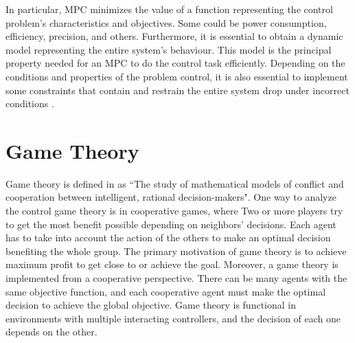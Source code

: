 In particular, MPC minimizes the value of a function representing the control problem's characteristics and objectives. Some could be power consumption, efficiency, precision, and others. Furthermore, it is essential to obtain a dynamic model representing the entire system's behaviour. This model is the principal property needed for an MPC to do the control task efficiently. Depending on the conditions and properties of the problem control, it is also essential to implement some constraints that contain and restrain the entire system drop under incorrect conditions \cite{MAYNE2000789}.\\








\section{Game Theory}

Game theory is defined in \cite{33t_GameTheory2} as ``The study of mathematical models of conflict and cooperation between intelligent, rational decision-makers". One way to analyze the control game theory is in cooperative games, where Two or more players try to get the most benefit possible depending on neighbors' decisions. Each agent has to take into account the action of the others to make an optimal decision benefiting the whole group. 
The primary motivation of game theory is to achieve maximum profit to get close to or achieve the goal. Moreover, a game theory is implemented from a cooperative perspective. There can be many agents with the same objective function, and each cooperative agent must make the optimal decision to achieve the global objective. Game theory is functional in environments with multiple interacting controllers, and the decision of each one depends on the other.

